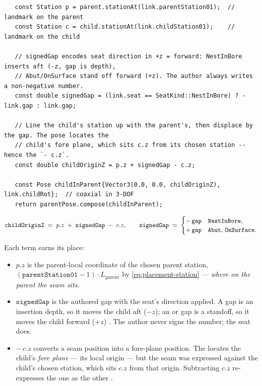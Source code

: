 \begin{listing}[htbp]
\begin{verbatim}
   const Station p = parent.stationAt(link.parentStation01);  // landmark on the parent
   const Station c = child.stationAt(link.childStation01);    // landmark on the child

   // signedGap encodes seat direction in +z = forward: NestInBore inserts aft (-z, gap is depth),
   // Abut/OnSurface stand off forward (+z). The author always writes a non-negative number.
   const double signedGap = (link.seat == SeatKind::NestInBore) ? -link.gap : link.gap;

   // Line the child's station up with the parent's, then displace by the gap. The pose locates the
   // child's fore plane, which sits c.z from its chosen station -- hence the `- c.z`.
   const double childOriginZ = p.z + signedGap - c.z;

   const Pose childInParent{Vector3(0.0, 0.0, childOriginZ), link.childRot};  // coaxial in 3-DOF
   return parentPose.compose(childInParent);
\end{verbatim}
\caption{The entire resolver core : two station
lookups, one seat-signed gap, one subtraction, one rigid-transform composition. Everything
else in the placement system exists to feed this arithmetic or to check its output.}
\label{lst:placement-resolver}
\end{listing}

\begin{equation}\label{eq:placement-resolver}
\mathtt{childOriginZ} \;=\; p.z \;+\; \mathtt{signedGap} \;-\; c.z,
\qquad
\mathtt{signedGap} \;=\;
\begin{cases}
-\,\mathtt{gap} & \text{\texttt{NestInBore},}\\
+\,\mathtt{gap} & \text{\texttt{Abut}, \texttt{OnSurface}.}
\end{cases}
\end{equation}

Each term earns its place:

\begin{itemize}
\item $p.z$ is the parent-local coordinate of the chosen parent station,
  $(\mathtt{parentStation01}-1)\cdot L_{\mathrm{parent}}$ by
  \cref{eq:placement-station} --- \emph{where on the parent the seam sits}.
\item $\mathtt{signedGap}$ is the authored gap with the seat's direction applied. A
   gap is an insertion depth, so it moves the child aft ($-z$); an
   or  gap is a standoff, so it moves the child forward
  ($+z$) . The author never signs the number; the
  seat does.
\item $-\,c.z$ converts a seam position into a fore-plane position. The 
  locates the child's \emph{fore plane} --- its local origin --- but the seam was
  expressed against the child's chosen station, which sits $c.z$ from that origin.
  Subtracting $c.z$ re-expresses the one as the other
  .
\end{itemize}


